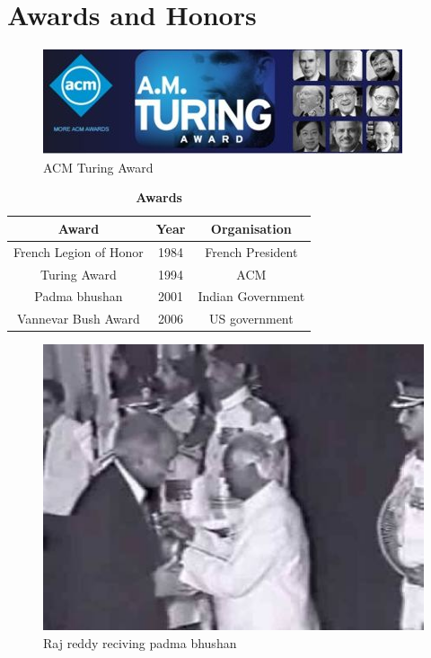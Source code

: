 \documentclass[a4paper,10pt]{article}
\begin{document}
\section{Awards and Honors}
   
\begin{figure}[!htb]
  \centering
  \includegraphics[scale=0.75]{turing.jpg}
  \caption{ACM Turing Award}
\end{figure}
       
\begin{table}[!htb]
  \centering
  \caption{\bf Awards}
  \begin{tabular}{||c|c|c||}
  \hline
  {\bf Award} & {\bf Year } & {\bf Organisation}\\
  \hline
  French Legion of Honor & 1984 & French President\\
  Turing Award & 1994 & ACM\footnotemark\\
  Padma bhushan & 2001 & Indian Government\\
  Vannevar Bush Award & 2006 & US government\\
  \hline
  \end{tabular}
\end{table}
    
\begin{figure}[!hbt]
  \centering
  \includegraphics[scale=0.5]{pb.jpg}
  \caption{Raj reddy reciving padma bhushan}
\end{figure}
  
\end{document}

